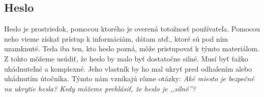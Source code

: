 \subsection{Heslo}
Heslo je prostriedok, pomocou ktorého je overená totožnosť používateľa. \cite{heslo} Pomocou neho vieme získať prístup k informáciám, dátam atď., ktoré sú pod ním uzamknuté. Teda iba ten, kto heslo pozná, môže pristupovať k týmto materiálom. Z tohto môžeme usúdiť, že heslo by malo byť dostatočne silné. Musí byť ťažko uhádnuteľné a komplexné. Jeho vlastník by ho mal ukryť pred odhalením alebo uhádnutím útočníka. Týmto nám vznikajú rôzne otázky: \textit{Aké miesto je bezpečné na ukrytie hesla? Kedy môžeme prehlásiť, že heslo je ,,silné''?}